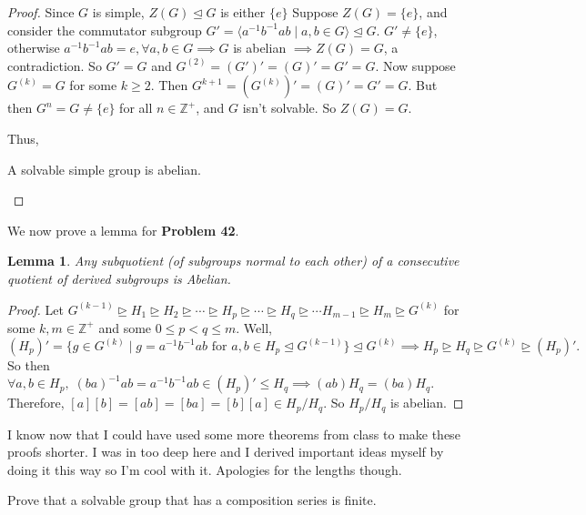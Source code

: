 \documentclass[addpoints,10pt]{exam}
\theoremstyle{plain}
\theoremstyle{definition}
\newtheorem{prob}[thm]{Problem}
\theoremstyle{plain}
\theoremstyle{plain}
\newtheorem{lem}[thm]{Lemma}
\theoremstyle{definition}
\let\oldprob\prob
\let\endoldprob\endprob
\renewenvironment{prob}
  {\begin{singlespace}\oldprob}
  {\endoldprob\end{singlespace}}
\newcommand{\ZZ}{\ensuremath{\mathbb{Z}}}
\begin{document}
\begin{proof}
Since $G$ is simple, $Z(G)\trianglelefteq G$ is either $\{e\}$ Suppose $Z(G)=\{e\}$, and consider the commutator subgroup $G'=\langle a^{-1}b^{-1}ab\mid a,b\in G\rangle\trianglelefteq G$. $G'\neq \{e\}$, otherwise $a^{-1}b^{-1}ab=e,\forall a,b\in G\implies G$ is abelian $\implies Z(G)=G$, a contradiction. So $G'=G$ and $G^{(2)}=(G')'=(G)'=G'=G$. Now suppose $G^{(k)}=G$ for some $k\geq 2$. Then $G^{k+1}=(G^{(k)})'=(G)'=G'=G$. But then $G^{n}=G\neq \{e\}$ for all $n\in \ZZ^{+}$, and $G$ isn't solvable. So $Z(G)=G$.

Thus,

\begin{center}
  A solvable simple group is abelian.
\end{center}
\end{proof}
We now prove a lemma for \textbf{Problem 42}.
\setcounter{thm}{0}   %
\begin{lem}
  Any subquotient (of subgroups normal to each other) of a consecutive quotient of derived subgroups is Abelian.
\end{lem}
\begin{proof}
Let $G^{(k-1)}\trianglerighteq  H_{1} \trianglerighteq H_{2}\trianglerighteq  \cdots \trianglerighteq H_{p}\trianglerighteq \cdots \trianglerighteq  H_{q}\trianglerighteq \cdots H_{m-1}\trianglerighteq H_{m} \trianglerighteq G^{(k)}$ for some $k,m\in \ZZ^{+}$ and some $0\leq p<q \leq m$. Well, 
$$(H_{p})'=\{g\in G^{(k)}\mid g=a^{-1}b^{-1}ab\text{ for }a,b\in H_{p}\trianglelefteq G^{(k-1)}\}\trianglelefteq G^{(k)}\implies H_{p}\trianglerighteq H_{q}\trianglerighteq G^{(k)}\trianglerighteq (H_{p})'.$$
So then $\forall a,b\in H_{p},\;(ba)^{-1}ab=a^{-1}b^{-1}ab\in (H_{p})'\leq H_{q}\implies (ab)H_{q}=(ba)H_{q}.$ Therefore, $[a][b]=[ab]=[ba]=[b][a]\in H_{p}/H_{q}$. So $H_{p}/H_{q}$ is abelian.
\end{proof}

I know now that I could have used some more theorems from class to make these proofs shorter. I was in too deep here and I derived important ideas myself by doing it this way so I'm cool with it. Apologies for the lengths though.
\newpage
\setcounter{thm}{41}   %
\begin{prob}
Prove that a solvable group that has a composition series is finite.
\end{prob}
\end{document}
